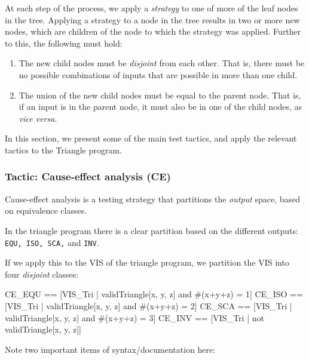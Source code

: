 At each step of the process, we apply a \emph{strategy} to one of more of the leaf nodes in the tree. Applying a strategy to a node in the tree results in two or more new nodes, which are children of the node to which the strategy was applied. Further to this, the following must hold:

\begin{enumerate}

 \item The new child nodes must be \emph{disjoint} from each other. That is, there must be no possible combinations of inputs that are possible in more than one child.

 \item The union of the new child nodes must be equal to the parent node. That is, if an input is in the parent node, it must also be in one of the child nodes, as \emph{vice versa}.

\end{enumerate}

In this section, we present some of the main test tactics, and apply the relevant tactics to the Triangle program.

\subsubsection{Tactic: Cause-effect analysis (CE)}

Cause-effect analysis is a testing strategy that partitions the {\em output} space, based on equivalence classes.

\begin{example}
In the triangle program there is a clear partition based on the different outputs: \texttt{EQU, ISO, SCA,} and \texttt{INV}.

If we apply this to the VIS of the triangle program, we partition the VIS into four {\em disjoint} classes:

\lstset{aboveskip=3mm}
\lstset{language=}
\begin{alloy}
 CE_EQU == [VIS_Tri | validTriangle[x, y, z] and #(x+y+z) = 1]
 CE_ISO == [VIS_Tri | validTriangle[x, y, z] and #(x+y+z) = 2]
 CE_SCA == [VIS_Tri | validTriangle[x, y, z] and #(x+y+z) = 3]
 CE_INV == [VIS_Tri | not validTriangle[x, y, z]]
\end{alloy}
\end{example}

Note two important items of syntax/documentation here:

